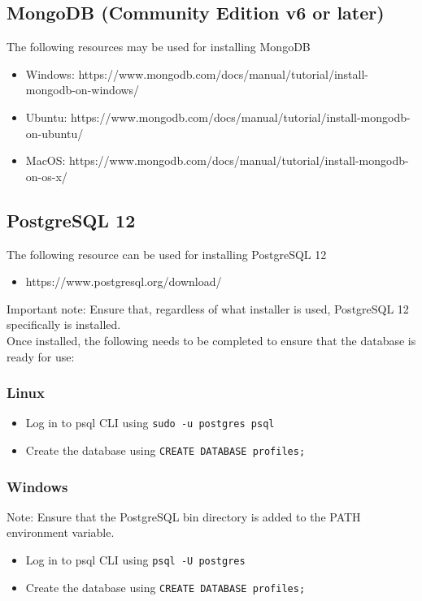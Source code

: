 \documentclass{article}
\newcommand{\code}[1]{\colorbox{light-gray}{\texttt{#1}}}
\begin{document}
\subsection{MongoDB (Community Edition v6 or later)}
The following resources may be used for installing MongoDB
\begin{itemize}
    \item Windows: https://www.mongodb.com/docs/manual/tutorial/install-mongodb-on-windows/
    \item Ubuntu: https://www.mongodb.com/docs/manual/tutorial/install-mongodb-on-ubuntu/
    \item MacOS: https://www.mongodb.com/docs/manual/tutorial/install-mongodb-on-os-x/
\end{itemize}

\subsection{PostgreSQL 12}
The following resource can be used for installing PostgreSQL 12
\begin{itemize}
    \item https://www.postgresql.org/download/
\end{itemize}
Important note: Ensure that, regardless of what installer is used, PostgreSQL 12 specifically is installed.\\
Once installed, the following needs to be completed to ensure that the database is ready for use:
\subsubsection*{Linux}
\begin{itemize}
    \item Log in to psql CLI using \code{sudo -u postgres psql}
    \item Create the database using \code{CREATE DATABASE profiles;}
\end{itemize}

\subsubsection*{Windows}
Note: Ensure that the PostgreSQL bin directory is added to the PATH environment variable.\\
\begin{itemize}
    \item Log in to psql CLI using \code{psql -U postgres}
    \item Create the database using \code{CREATE DATABASE profiles;}
\end{itemize}
\end{document}

